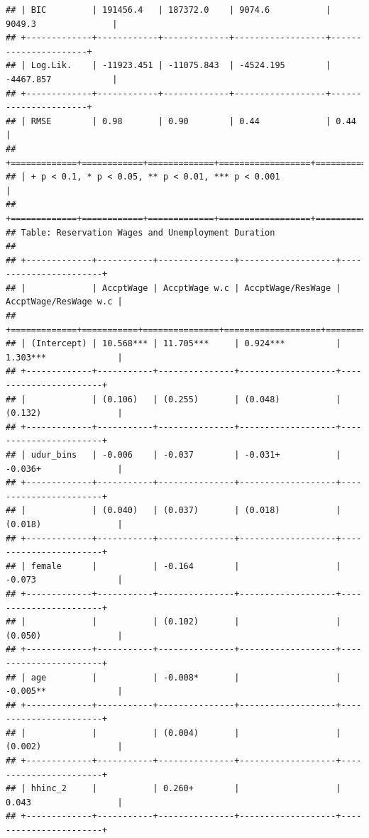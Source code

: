 \documentclass[
]{article}
\begin{document}
\begin{verbatim}
## | BIC         | 191456.4   | 187372.0    | 9074.6           | 9049.3               |
## +-------------+------------+-------------+------------------+----------------------+
## | Log.Lik.    | -11923.451 | -11075.843  | -4524.195        | -4467.857            |
## +-------------+------------+-------------+------------------+----------------------+
## | RMSE        | 0.98       | 0.90        | 0.44             | 0.44                 |
## +=============+============+=============+==================+======================+
## | + p < 0.1, * p < 0.05, ** p < 0.01, *** p < 0.001                                |
## +=============+============+=============+==================+======================+
## Table: Reservation Wages and Unemployment Duration 
## 
## +-------------+-----------+---------------+-------------------+-----------------------+
## |             | AccptWage | AccptWage w.c | AccptWage/ResWage | AccptWage/ResWage w.c |
## +=============+===========+===============+===================+=======================+
## | (Intercept) | 10.568*** | 11.705***     | 0.924***          | 1.303***              |
## +-------------+-----------+---------------+-------------------+-----------------------+
## |             | (0.106)   | (0.255)       | (0.048)           | (0.132)               |
## +-------------+-----------+---------------+-------------------+-----------------------+
## | udur_bins   | -0.006    | -0.037        | -0.031+           | -0.036+               |
## +-------------+-----------+---------------+-------------------+-----------------------+
## |             | (0.040)   | (0.037)       | (0.018)           | (0.018)               |
## +-------------+-----------+---------------+-------------------+-----------------------+
## | female      |           | -0.164        |                   | -0.073                |
## +-------------+-----------+---------------+-------------------+-----------------------+
## |             |           | (0.102)       |                   | (0.050)               |
## +-------------+-----------+---------------+-------------------+-----------------------+
## | age         |           | -0.008*       |                   | -0.005**              |
## +-------------+-----------+---------------+-------------------+-----------------------+
## |             |           | (0.004)       |                   | (0.002)               |
## +-------------+-----------+---------------+-------------------+-----------------------+
## | hhinc_2     |           | 0.260+        |                   | 0.043                 |
## +-------------+-----------+---------------+-------------------+-----------------------+

\end{verbatim}
\end{document}

